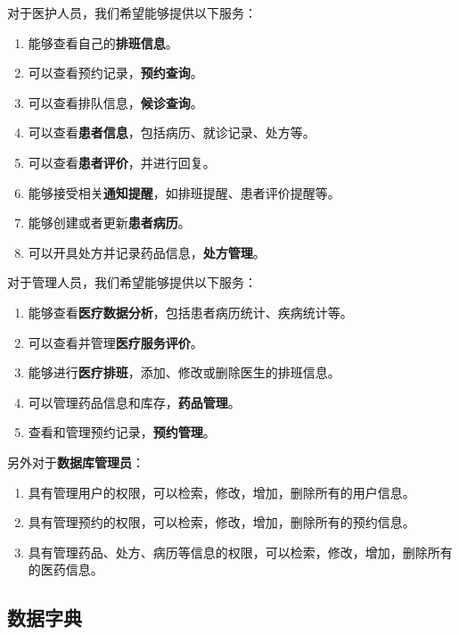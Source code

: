 \documentclass{article}
\begin{document}
\vspace{0.5cm}
对于医护人员，我们希望能够提供以下服务：
\begin{enumerate}[itemsep=0.01em]
    \item 能够查看自己的\textbf{排班信息}。
    \item 可以查看预约记录，\textbf{预约查询}。
    \item 可以查看排队信息，\textbf{候诊查询}。
    \item 可以查看\textbf{患者信息}，包括病历、就诊记录、处方等。
    \item 可以查看\textbf{患者评价}，并进行回复。
    \item 能够接受相关\textbf{通知提醒}，如排班提醒、患者评价提醒等。
    \item 能够创建或者更新\textbf{患者病历}。
    \item 可以开具处方并记录药品信息，\textbf{处方管理}。
\end{enumerate}

\vspace{0.5cm}
对于管理人员，我们希望能够提供以下服务：
\begin{enumerate}[itemsep=0.01em]
    \item 能够查看\textbf{医疗数据分析}，包括患者病历统计、疾病统计等。
    \item 可以查看并管理\textbf{医疗服务评价}。
    \item 能够进行\textbf{医疗排班}，添加、修改或删除医生的排班信息。
    \item 可以管理药品信息和库存，\textbf{药品管理}。
    \item 查看和管理预约记录，\textbf{预约管理}。
\end{enumerate}

\vspace{0.5cm}
另外对于\textbf{数据库管理员}：
\begin{enumerate}[itemsep=0.01em]
    \item 具有管理用户的权限，可以检索，修改，增加，删除所有的用户信息。
    \item 具有管理预约的权限，可以检索，修改，增加，删除所有的预约信息。
    \item 具有管理药品、处方、病历等信息的权限，可以检索，修改，增加，删除所有的医药信息。
\end{enumerate}

\subsection{数据字典}
\end{document}
